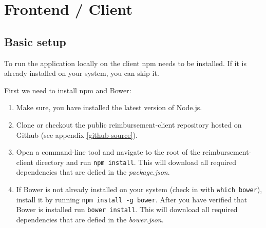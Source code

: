 \section{Frontend / Client}

\subsection{Basic setup}
To run the application locally on the client npm needs to be installed. If it is already installed on your system, you can skip it.

First we need to install npm and Bower:
\begin{enumerate}
  \item Make sure, you have installed the latest version of Node.js.
  \item Clone or checkout the public reimbursement-client repository hosted on Github (see appendix \ref{github-source}).
  \item Open a command-line tool and navigate to the root of the reimbursement-client directory and run \texttt{npm install}. This will download all required dependencies that are defied in the \textit{package.json}.
  \item If Bower is not already installed on your system (check in with \texttt{which bower}), install it by running \texttt{npm install -g bower}. After you have verified that Bower is installed run \texttt{bower install}. This will download all required dependencies that are defied in the \textit{bower.json}.
\end{enumerate}

